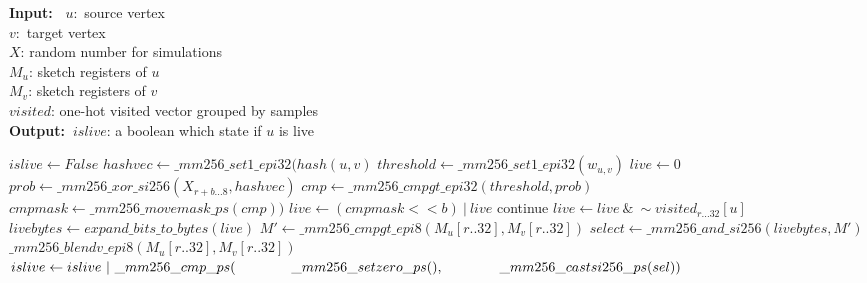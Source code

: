 \documentclass[10pt,journal,compsoc]{IEEEtran}
\renewcommand{\algorithmicrequire}{\textbf{Input:~}}
\renewcommand{\algorithmicensure}{\textbf{Output:~}}
\begin{document}


\begin{algorithm}
    \caption{ ({$u,v,X_r,M_u,M_v,$})}\label{alg:VecLabel}
    \algorithmicrequire{
    $u:$ source vertex\\
    \hspace*{7ex}$v:$ target vertex\\
    \hspace*{7ex}$X$: random number for simulations\\
    \hspace*{7ex}$M_u$: sketch registers of $u$\\
    \hspace*{7ex}$M_v$: sketch registers of $v$\\
    \hspace*{7ex}$visited$: one-hot visited vector grouped by samples}\\
    \algorithmicensure{$islive$: a boolean which state if $u$ is live}
    \begin{algorithmic}[1]
        \State $islive \leftarrow False$
        \For{$r \in [0,J)~|~r~mod~32 = 0$}
            \State $hashvec \leftarrow \_mm256\_set1\_epi32(hash(u,v)$
            \State $threshold \leftarrow \_mm256\_set1\_epi32(w_{u,v})$
            \State $live \leftarrow 0$
            \For{$b\in [0,32)~|~b~mod~8 = 0 $}
                \State $prob \leftarrow \_mm256\_xor\_si256(X_{r+b\dots8},hashvec)$
                \State $cmp \leftarrow \_mm256\_cmpgt\_epi32(threshold, prob)$
                \State $cmpmask \leftarrow \_mm256\_movemask\_ps(cmp))$
                \State $live\leftarrow (cmpmask<<b)~|~live $
                \EndFor
                    \State continue
                \EndIf
                \State $live \leftarrow live~\&~\sim visited_{r\dots32}[u]$
                \State $livebytes \leftarrow expand\_bits\_to\_bytes(live)$
                \State $M' \leftarrow 
                    \_mm256\_cmpgt\_epi8(M_u[r..32],M_v[r..32])$
                \State $select \leftarrow \_mm256\_and\_si256(livebytes,M')$
                \State $\_mm256\_blendv\_epi8(M_u[r..32],M_v[r..32])$
                \State $islive \leftarrow islive~|~  \_mm256\_cmp\_ps(\newline
                    \hspace*{4em}\_mm256\_setzero\_ps(), \newline
                    \hspace*{4em}\_mm256\_castsi256\_ps(sel))$



\end{algorithmic}
\end{algorithm}
\end{document}
